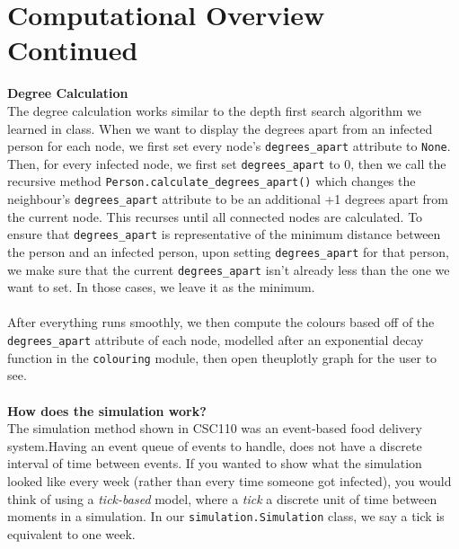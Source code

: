 \documentclass[fontsize=11pt]{article}
\newcommand{\ttt}[1]{\texttt{#1}}
\begin{document}
    \section*{Computational Overview Continued}
    \textbf{Degree Calculation} \\
    The degree calculation works similar to the depth first search algorithm we learned in class. When we want to display the degrees apart from an infected person for each node, we first set every node's \ttt{degrees\_apart} attribute to \ttt{None}. Then, for every infected node, we first set \ttt{degrees\_apart} to 0, then we call the recursive method \ttt{Person.calculate\_degrees\_apart()} which changes the neighbour's \ttt{degrees\_apart} attribute to be an additional +1 degrees apart from the current node. This recurses until all connected nodes are calculated. To ensure that \ttt{degrees\_apart} is representative of the minimum distance between the person and an infected person, upon setting \ttt{degrees\_apart} for that person, we make sure that the current \ttt{degrees\_apart} isn't already less than the one we want to set. In those cases, we leave it as the minimum. \\ \\
    After everything runs smoothly, we then compute the colours based off of the \ttt{degrees\_apart} attribute of each node, modelled after an exponential decay function in the \ttt{colouring} module, then open theuplotly graph for the user to see.
    \\ \\
    \textbf{How does the simulation work?} \\
    The simulation method shown in CSC110 was an event-based food delivery system.Having an event queue of events to handle, does not have a discrete interval of time between events. If you wanted to show what the simulation looked like every week (rather than every time someone got infected), you would think of using a \emph{tick-based} model, where a \emph{tick} a discrete unit of time between moments in a simulation. In our \ttt{simulation.Simulation} class, we say a tick is equivalent to one week.
    \\ \\
\end{document}

